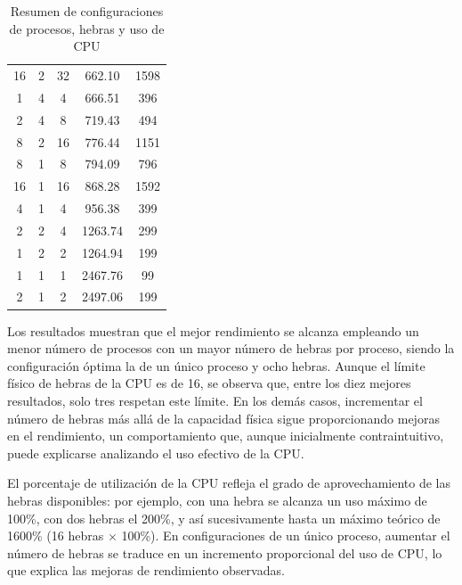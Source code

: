 \begin{table}[ht]
\begin{tabular}{|c|c|c|c|c|}
        16                & 2                    & 32               & 662.10          & 1598              \\
        1                 & 4                    & 4                & 666.51          & 396               \\
        2                 & 4                    & 8                & 719.43          & 494               \\
        8                 & 2                    & 16               & 776.44          & 1151              \\
        8                 & 1                    & 8                & 794.09          & 796               \\
        16                & 1                    & 16               & 868.28          & 1592              \\
        4                 & 1                    & 4                & 956.38          & 399               \\
        2                 & 2                    & 4                & 1263.74         & 299               \\
        1                 & 2                    & 2                & 1264.94         & 199               \\
        1                 & 1                    & 1                & 2467.76         & 99                \\
        2                 & 1                    & 2                & 2497.06         & 199               \\
        \hline
    \end{tabular}
    \caption{Resumen de configuraciones de procesos, hebras y uso de CPU}
    \label{tab:summary_nodes_threads_cpu}
\end{table}

Los resultados muestran que el mejor rendimiento se alcanza empleando un menor número de procesos con un mayor número de hebras por proceso, siendo la configuración óptima la de un único proceso y ocho hebras. Aunque el límite físico de hebras de la CPU es de 16, se observa que, entre los diez mejores resultados, solo tres respetan este límite. En los demás casos, incrementar el número de hebras más allá de la capacidad física sigue proporcionando mejoras en el rendimiento, un comportamiento que, aunque inicialmente contraintuitivo, puede explicarse analizando el uso efectivo de la CPU.

El porcentaje de utilización de la CPU refleja el grado de aprovechamiento de las hebras disponibles: por ejemplo, con una hebra se alcanza un uso máximo de 100\%, con dos hebras el 200\%, y así sucesivamente hasta un máximo teórico de 1600\% (16 hebras $\times$ 100\%). En configuraciones de un único proceso, aumentar el número de hebras se traduce en un incremento proporcional del uso de CPU, lo que explica las mejoras de rendimiento observadas.

